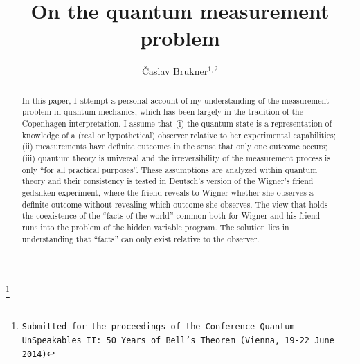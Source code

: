 \documentclass[12pt]{article}
\renewcommand{\thefootnote}{\fnsymbol{footnote}}
\begin{document}
\renewcommand{\thefootnote}{\arabic{footnote}}

\title{On the quantum measurement problem}


\author{{\v C}aslav Brukner$^{1,2}$}
 \thanks{\texttt{Submitted for the proceedings of the Conference Quantum UnSpeakables II: 50 Years of Bell's Theorem (Vienna, 19-22 June 2014)}}


\date{\vspace{-5ex}}
  \maketitle
  \begin{abstract}

In this paper, I attempt a personal account of my understanding of the measurement problem in quantum mechanics, which has been largely in the tradition of the Copenhagen interpretation. I assume that (i) the quantum state is a representation of knowledge of a (real or hypothetical) observer relative to her experimental capabilities; (ii)  measurements have definite outcomes in the sense that only one outcome occurs; (iii) quantum theory is universal and the irreversibility of the measurement process is only ``for all practical purposes''. These assumptions are analyzed within quantum theory and their consistency is tested in Deutsch's version of the Wigner's friend gedanken experiment, where the friend reveals to Wigner whether she observes a definite outcome without revealing which outcome she observes. The view that holds the coexistence of the ``facts of the world'' common both for Wigner and his friend runs into the problem of the hidden variable program. The solution lies in understanding that ``facts'' can only exist relative to the observer. 

\end{abstract}
\end{document}

